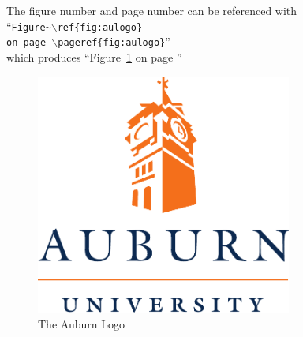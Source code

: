\documentclass[12pt]{article}
\begin{document}
\LARGE
\noindent The figure number and page number can be referenced with\\
``\texttt{Figure\~{}$\backslash$ref\{fig:aulogo\} \\on page
$\backslash$pageref\{fig:aulogo\}}''\\ which produces
``Figure~\ref{fig:aulogo} on page \pageref{fig:aulogo}''
\begin{figure}[htbp]
  \centering
  \includegraphics[width=0.75\textwidth]{aulogo.pdf}
  \caption{\large The Auburn Logo}
  \label{fig:aulogo}
\end{figure}
\end{document}
